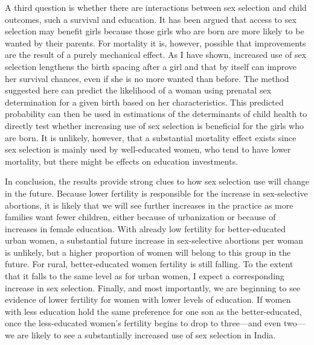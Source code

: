 \documentclass[12pt,letterpaper]{article}
\begin{document}



A third question is whether there are interactions between sex selection and child outcomes,
such a survival and education.
It has been argued that access to sex selection may benefit girls because those girls
who are born are more likely to be wanted by their parents.
For mortality it is, however, possible that improvements are the result of a purely 
mechanical effect.
As I have shown, increased use of sex selection lengthens the birth spacing after a girl 
and that by itself can improve her survival chances, even if she is no more wanted than before.
The method suggested here can predict the likelihood of a woman using prenatal sex 
determination for a given birth based on her characteristics.
This predicted probability can then be used in estimations of the determinants
of child health to directly test whether increasing use of sex selection is 
beneficial for the girls who are born.
It is unlikely, however, that a substantial mortality effect exists since sex 
selection is mainly used by well-educated women, who tend to have lower mortality, 
but there might be effects on education investments.

In conclusion, the results provide strong clues to how sex selection use will change in the future.
Because lower fertility is responsible for the increase in sex-selective abortions, 
it is likely that we will see further increases in the practice as more families 
want fewer children, either because of urbanization or because of increases in female 
education.
With already low fertility for better-educated urban women, a substantial future increase 
in sex-selective abortions per woman is unlikely, 
but a higher proportion of women will belong to this group in the future.
For rural, better-educated women fertility is still falling.
To the extent that it falls to the same level as for urban
women, I expect a corresponding increase in sex selection.
Finally, and most importantly, we are beginning to see evidence of lower fertility 
for women with lower levels of education.
If women with less education hold the same preference for one son as the better-educated,
once the less-educated women's fertility begins to drop to three---and even two---we are 
likely to see a substantially increased use of sex selection in India.
\end{document}
